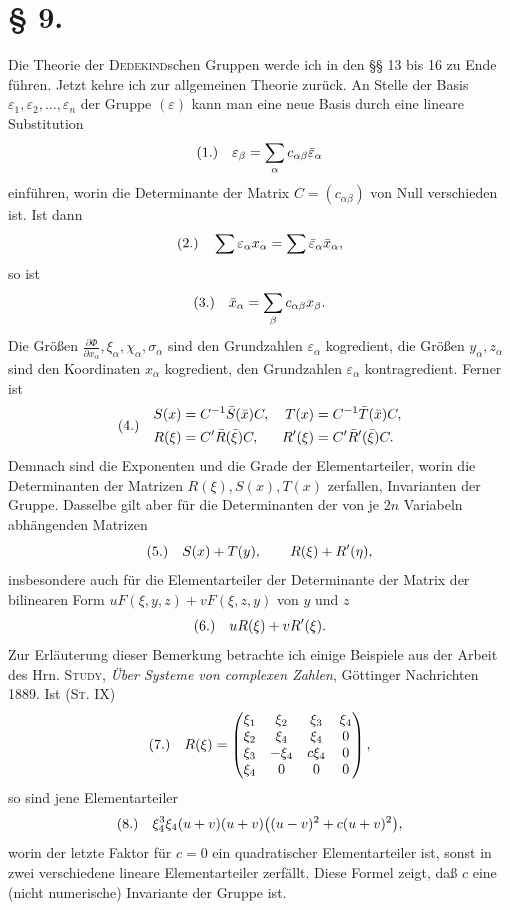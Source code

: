 \documentclass[11pt]{article}
\newcommand{\eps}{\varepsilon}
\newcommand{\fnum}[1]{\textup{(\ensuremath{#1}.)}\quad}
\begin{document}
\section*{§ 9.}

Die Theorie der \textsc{Dedekind}schen Gruppen werde ich in den §§ 13 bis 16 zu Ende führen. Jetzt kehre ich zur allgemeinen Theorie zurück. An Stelle der Basis $\eps_1,\eps_2,\ldots,\eps_n$ der Gruppe $(\eps)$ kann man eine neue Basis durch eine lineare Substitution
\[
\fnum{1} \eps_\beta=\sum_\alpha c_{\alpha\beta}\bar\eps_\alpha
\]
einführen, worin die Determinante der Matrix $C=(c_{\alpha\beta})$ von Null verschieden ist. Ist dann
\[
\fnum{2} \sum \eps_\alpha x_\alpha=\sum\bar\eps_\alpha\bar x_\alpha,
\]
so ist
\[
\fnum{3} \bar x_\alpha=\sum_\beta c_{\alpha\beta}x_\beta.
\]
Die Größen $\frac{\partial\Phi}{\partial x_\alpha},\xi_\alpha,\chi_\alpha,\sigma_\alpha$ sind den Grundzahlen $\eps_\alpha$ kogredient, die Größen $y_\alpha,z_\alpha$ sind den Koordinaten $x_\alpha$ kogredient, den Grundzahlen $\eps_\alpha$ kontragredient. Ferner ist
\[
\fnum{4}
\begin{aligned}
S(x)&=C^{-1}\bar S(\bar x)C,
& T(x)&=C^{-1}\bar T(\bar x)C,\\
R(\xi)&=C'\bar R(\bar\xi)C,
& R'(\xi)&=C'\bar R'(\bar\xi)C.
\end{aligned}
\]
Demnach sind die Exponenten und die Grade der Elementarteiler, worin die Determinanten der Matrizen $R(\xi),S(x),T(x)$ zerfallen, Invarianten der Gruppe. Dasselbe gilt aber für die Determinanten der von je $2n$ Variabeln abhängenden Matrizen
\[
\fnum{5} S(x)+T(y),\qquad R(\xi)+R'(\eta),
\]
insbesondere auch für die Elementarteiler der Determinante der Matrix der bilinearen Form $uF(\xi,y,z)+vF(\xi,z,y)$ von $y$ und $z$
\[
\fnum{6} uR(\xi)+vR'(\xi).
\]
Zur Erläuterung dieser Bemerkung betrachte ich einige Beispiele aus der Arbeit des Hrn. \textsc{Study}, \emph{Über Systeme von complexen Zahlen}, Göttinger Nachrichten 1889. Ist (\textsc{St}. IX)
\[
\fnum{7} R(\xi)=
\begin{pmatrix}
\xi_1&\xi_2&\xi_3&\xi_4\\
\xi_2&\xi_4&\xi_4&0\\
\xi_3&-\xi_4&c\xi_4&0\\
\xi_4&0&0&0
\end{pmatrix},
\]
so sind jene Elementarteiler
\[
\fnum{8} \xi_4^3\xi_4(u+v)(u+v)\bigl((u-v)^2+c(u+v)^2\bigr),
\]
worin der letzte Faktor für $c=0$ ein quadratischer Elementarteiler ist, sonst in zwei verschiedene lineare Elementarteiler zerfällt. Diese Formel zeigt, daß $c$ eine (nicht numerische) Invariante der Gruppe ist.
\end{document}
